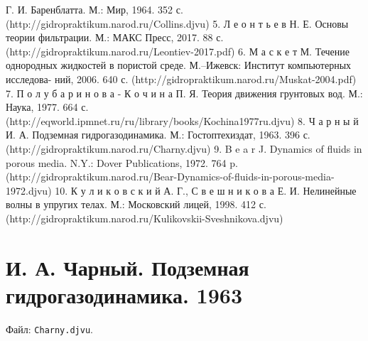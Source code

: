 \documentclass[
  11pt,
]{article}
\begin{document}
Г. И. Баренблатта. М.: Мир, 1964. 352 с. (http://gidropraktikum.narod.ru/Collins.djvu) 5. Л е о н т ь е в Н. Е. Основы теории фильтрации. М.: МАКС Пресс, 2017. 88 с. (http://gidropraktikum.narod.ru/Leontiev-2017.pdf) 6. М а с к е т М. Течение однородных жидкостей в пористой среде. М.--Ижевск: Институт компьютерных исследова- ний, 2006. 640 с. (http://gidropraktikum.narod.ru/Muskat-2004.pdf) 7. П о л у б а р и н о в а - К о ч и н а П. Я. Теория движения грунтовых вод. М.: Наука, 1977. 664 с. (http://eqworld.ipmnet.ru/ru/library/books/Kochina1977ru.djvu) 8. Ч а р н ы й И. А. Подземная гидрогазодинамика. М.: Гостоптехиздат, 1963. 396 с. (http://gidropraktikum.narod.ru/Charny.djvu) 9. B e a r J. Dynamics of ﬂuids in porous media. N.Y.: Dover Publications, 1972. 764 p. (http://gidropraktikum.narod.ru/Bear-Dynamics-of-fluids-in-porous-media-1972.djvu) 10. К у л и к о в с к и й А. Г., С в е ш н и к о в а Е. И. Нелинейные волны в упругих телах. М.: Московский лицей, 1998. 412 с. (http://gidropraktikum.narod.ru/Kulikovskii-Sveshnikova.djvu)


\section{И. А. Чарный. Подземная гидрогазодинамика. 1963}\label{section-05}

Файл: \texttt{Charny.djvu}.
\end{document}
